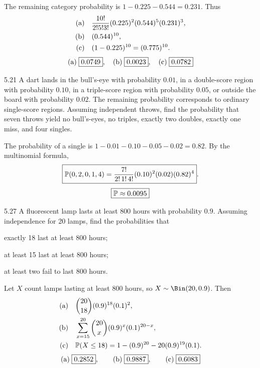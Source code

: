 \documentclass[11pt,oneside]{article}
\begin{document}
\begin{solution}
The remaining category probability is $1-0.225-0.544=0.231$. Thus
\begin{align*}
\textup{(a)}\quad&\frac{10!}{2!5!3!}(0.225)^2(0.544)^5(0.231)^3,\\
\textup{(b)}\quad&(0.544)^{10},\\
\textup{(c)}\quad&(1-0.225)^{10}=(0.775)^{10}.
\end{align*}
\[
\textup{(a)}\;\boxed{0.0749},\quad\textup{(b)}\;\boxed{0.0023},\quad\textup{(c)}\;\boxed{0.0782}
\]
\end{solution}

\begin{exercise}{5.21}
A dart lands in the bull's-eye with probability $0.01$, in a double-score region with probability $0.10$, in a triple-score region with probability $0.05$, or outside the board with probability $0.02$. The remaining probability corresponds to ordinary single-score regions. Assuming independent throws, find the probability that seven throws yield no bull's-eyes, no triples, exactly two doubles, exactly one miss, and four singles.
\end{exercise}

\begin{solution}
The probability of a single is $1-0.01-0.10-0.05-0.02=0.82$. By the multinomial formula,
\[
\boxed{\mathbb{P}(0,2,0,1,4)=\frac{7!}{2!\,1!\,4!}
(0.10)^2(0.02)(0.82)^4}.
\]
\[
\boxed{\mathbb{P}\approx 0.0095}
\]
\end{solution}

\begin{exercise}{5.27}
A fluorescent lamp lasts at least 800 hours with probability $0.9$. Assuming independence for 20 lamps, find the probabilities that
\par
\begin{exercisesubparts}
\item exactly 18 last at least 800 hours;
\item at least 15 last at least 800 hours;
\item at least two fail to last 800 hours.
\end{exercisesubparts}
\end{exercise}

\begin{solution}
Let $X$ count lamps lasting at least 800 hours, so $X\sim\Bin(20,0.9)$. Then
\begin{align*}
\textup{(a)}\quad&\binom{20}{18}(0.9)^{18}(0.1)^2,\\
\textup{(b)}\quad&\sum_{x=15}^{20}\binom{20}{x}(0.9)^x(0.1)^{20-x},\\
\textup{(c)}\quad&\mathbb{P}(X\le18)=1-(0.9)^{20}-20(0.9)^{19}(0.1).
\end{align*}
\[
\textup{(a)}\;\boxed{0.2852},\qquad \textup{(b)}\;\boxed{0.9887},\qquad \textup{(c)}\;\boxed{0.6083}
\]
\end{solution}
\end{document}
